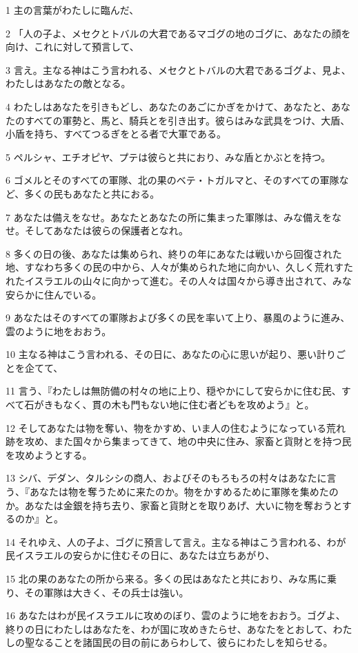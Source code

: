 \par 1 主の言葉がわたしに臨んだ、
\par 2 「人の子よ、メセクとトバルの大君であるマゴグの地のゴグに、あなたの顔を向け、これに対して預言して、
\par 3 言え。主なる神はこう言われる、メセクとトバルの大君であるゴグよ、見よ、わたしはあなたの敵となる。
\par 4 わたしはあなたを引きもどし、あなたのあごにかぎをかけて、あなたと、あなたのすべての軍勢と、馬と、騎兵とを引き出す。彼らはみな武具をつけ、大盾、小盾を持ち、すべてつるぎをとる者で大軍である。
\par 5 ペルシャ、エチオピヤ、プテは彼らと共におり、みな盾とかぶとを持つ。
\par 6 ゴメルとそのすべての軍隊、北の果のベテ・トガルマと、そのすべての軍隊など、多くの民もあなたと共におる。
\par 7 あなたは備えをなせ。あなたとあなたの所に集まった軍隊は、みな備えをなせ。そしてあなたは彼らの保護者となれ。
\par 8 多くの日の後、あなたは集められ、終りの年にあなたは戦いから回復された地、すなわち多くの民の中から、人々が集められた地に向かい、久しく荒れすたれたイスラエルの山々に向かって進む。その人々は国々から導き出されて、みな安らかに住んでいる。
\par 9 あなたはそのすべての軍隊および多くの民を率いて上り、暴風のように進み、雲のように地をおおう。
\par 10 主なる神はこう言われる、その日に、あなたの心に思いが起り、悪い計りごとを企てて、
\par 11 言う、『わたしは無防備の村々の地に上り、穏やかにして安らかに住む民、すべて石がきもなく、貫の木も門もない地に住む者どもを攻めよう』と。
\par 12 そしてあなたは物を奪い、物をかすめ、いま人の住むようになっている荒れ跡を攻め、また国々から集まってきて、地の中央に住み、家畜と貨財とを持つ民を攻めようとする。
\par 13 シバ、デダン、タルシシの商人、およびそのもろもろの村々はあなたに言う、『あなたは物を奪うために来たのか。物をかすめるために軍隊を集めたのか。あなたは金銀を持ち去り、家畜と貨財とを取りあげ、大いに物を奪おうとするのか』と。
\par 14 それゆえ、人の子よ、ゴグに預言して言え。主なる神はこう言われる、わが民イスラエルの安らかに住むその日に、あなたは立ちあがり、
\par 15 北の果のあなたの所から来る。多くの民はあなたと共におり、みな馬に乗り、その軍隊は大きく、その兵士は強い。
\par 16 あなたはわが民イスラエルに攻めのぼり、雲のように地をおおう。ゴグよ、終りの日にわたしはあなたを、わが国に攻めきたらせ、あなたをとおして、わたしの聖なることを諸国民の目の前にあらわして、彼らにわたしを知らせる。
